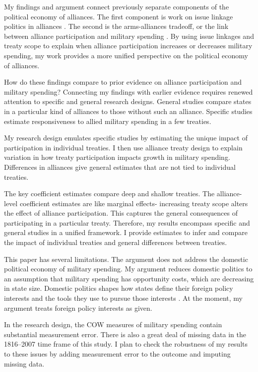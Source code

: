 \documentclass[12pt]{article}
\begin{document}
My findings and argument connect previously separate components of the political economy of alliances. 
The first component is work on issue linkage politics in alliances \citep{Poast2012, Poast2013, Johnson2015}.
The second is the arms-alliances tradeoff, or the link between alliance participation and military spending \citep{Morrow1993}. 
By using issue linkages and treaty scope to explain when alliance participation increases or decreases military spending, my work provides a more unified perspective on the political economy of alliances.  


How do these findings compare to prior evidence on alliance participation and military spending? 
Connecting my findings with earlier evidence requires renewed attention to specific and general research designs. 
General studies compare states in a particular kind of alliances to those without such an alliance. 
Specific studies estimate responsiveness to allied military spending in a few treaties. 


My research design emulates specific studies by estimating the unique impact of participation in individual treaties. 
I then use alliance treaty design to explain variation in how treaty participation impacts growth in military spending.
Differences in alliances give general estimates that are not tied to individual treaties.  


The key coefficient estimates compare deep and shallow treaties. 
The alliance-level coefficient estimates are like marginal effects- increasing treaty scope alters the effect of alliance participation.
This captures the general consequences of participating in a particular treaty. 
Therefore, my results encompass specific and general studies in a unified framework. 
I provide estimates to infer and compare the impact of individual treaties and general differences between treaties. 


This paper has several limitations.
The argument does not address the domestic political economy of military spending. 
My argument reduces domestic politics to an assumption that military spending has opportunity costs, which are decreasing in state size. 
Domestic politics shapes how states define their foreign policy interests and the tools they use to pursue those interests \citep{Fordham1998, Fordham2011, Narizny2007}.
At the moment, my argument treats foreign policy interests as given.  


In the research design, the COW measures of military spending contain substantial measurement error. 
There is also a great deal of missing data in the 1816--2007 time frame of this study. 
I plan to check the robustness of my results to these issues by adding measurement error to the outcome and imputing missing data.
\end{document}
